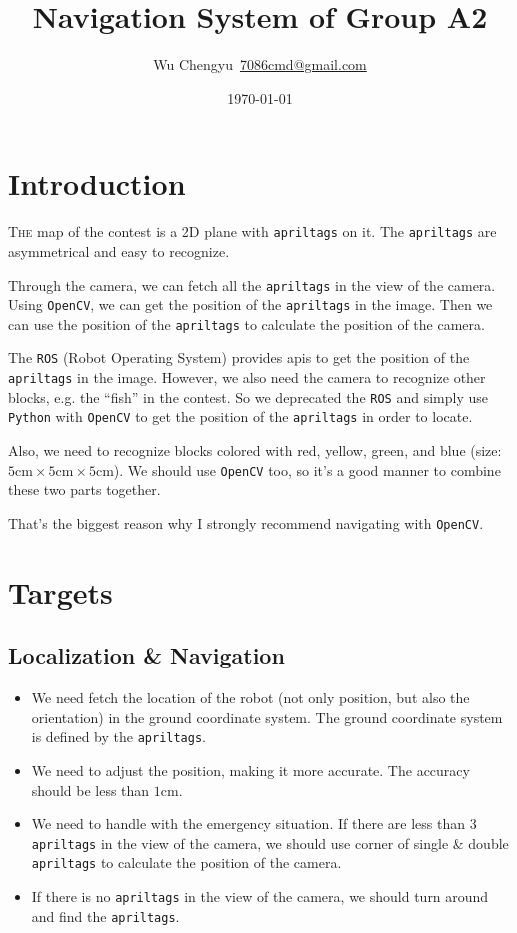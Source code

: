 \documentclass{article}
\title{Navigation System of Group A2}
\author{Wu Chengyu\ \url{7086cmd@gmail.com}}
\date{\today}
\begin{document}
\maketitle

\newpage

\tableofcontents

\newpage

\section{Introduction}
\lettrine{T}{he} map of the contest is a 2D plane with \texttt{apriltags} on it. The \texttt{apriltags} are asymmetrical and easy to recognize.

Through the camera, we can fetch all the \texttt{apriltags} in the view of the camera. Using \texttt{OpenCV}, we can get the position of the \texttt{apriltags} in the image. Then we can use the position of the \texttt{apriltags} to calculate the position of the camera.

The \texttt{ROS} (Robot Operating System) provides apis to get the position of the \texttt{apriltags} in the image. However, we also need the camera to recognize other blocks, e.g. the ``fish'' in the contest. So we deprecated the \texttt{ROS} and simply use \texttt{Python} with \texttt{OpenCV} to get the position of the \texttt{apriltags} in order to locate.

Also, we need to recognize blocks colored with red, yellow, green, and blue (size: $5\mathrm{cm}\times5\mathrm{cm}\times5\mathrm{cm}$). We should use \texttt{OpenCV} too, so it's a good manner to combine these two parts together.

That's the biggest reason why I strongly recommend navigating with \texttt{OpenCV}.

\section{Targets}

\subsection{Localization \& Navigation}

\begin{itemize}
  \item We need fetch the location of the robot (not only position, but also the orientation) in the ground coordinate system. The ground coordinate system is defined by the \texttt{apriltags}.
  \item We need to adjust the position, making it more accurate. The accuracy should be less than $1\mathrm{cm}$.
  \item We need to handle with the emergency situation. If there are less than $3$ \texttt{apriltags} in the view of the camera, we should use corner of single \& double \texttt{apriltags} to calculate the position of the camera.
  \item If there is no \texttt{apriltags} in the view of the camera, we should turn around and find the \texttt{apriltags}.
\end{itemize}
\end{document}

